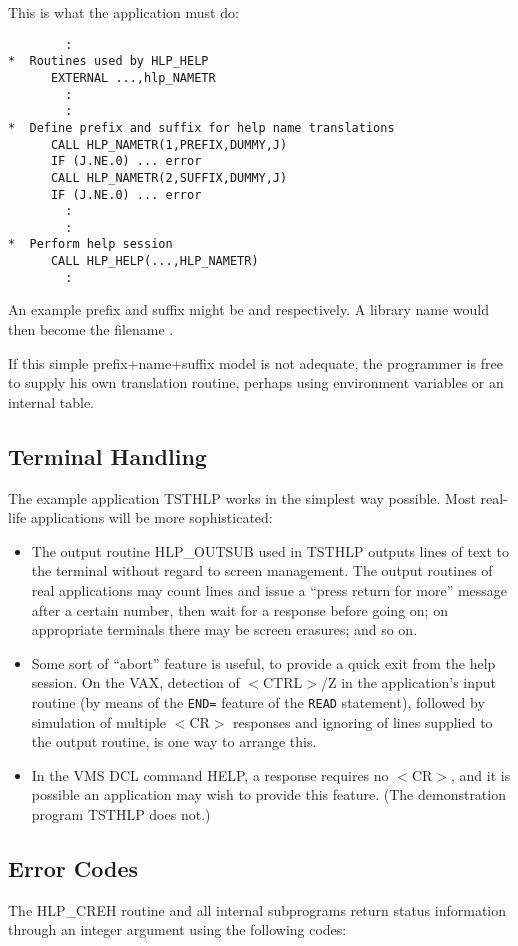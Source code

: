 This is what the application must do:
\begin{verbatim}
        :
*  Routines used by HLP_HELP
      EXTERNAL ...,hlp_NAMETR
        :
        :
*  Define prefix and suffix for help name translations
      CALL HLP_NAMETR(1,PREFIX,DUMMY,J)
      IF (J.NE.0) ... error
      CALL HLP_NAMETR(2,SUFFIX,DUMMY,J)
      IF (J.NE.0) ... error
        :
        :
*  Perform help session
      CALL HLP_HELP(...,HLP_NAMETR)
        :
\end{verbatim}
An example prefix and suffix might be  and
 respectively.  A library name  would
then become the filename .

If this simple prefix+name+suffix model is not adequate, the programmer
is free to supply his own translation routine, perhaps using
environment variables or an internal table.

\subsection{Terminal Handling}
The example application TSTHLP works in the simplest way possible.  Most
real-life applications will be more sophisticated:
\begin{itemize}
\item The output routine HLP\_OUTSUB used in
TSTHLP outputs lines of text to the terminal without
regard to screen management.  The output routines of real
applications may count lines and issue a ``press return for more''
message after a certain number, then wait for a response before going
on; on appropriate terminals there may be screen erasures; and
so on.
\item Some sort of ``abort'' feature is useful, to provide a
quick exit from the help session.  On the VAX,
detection of $<$CTRL$>$/Z in the
application's input routine (by means of the {\tt END=} feature
of the {\tt READ} statement), followed by simulation of multiple
$<$CR$>$ responses and ignoring of lines supplied to the output routine, is
one way to arrange this.
\item In the VMS DCL command HELP, a  response requires no
$<$CR$>$, and it is possible an application may wish to provide this
feature.  (The demonstration program TSTHLP does not.)
\end{itemize}

\subsection{Error Codes}
The HLP\_CREH routine and all internal subprograms
return status information through an integer argument using the
following codes:

